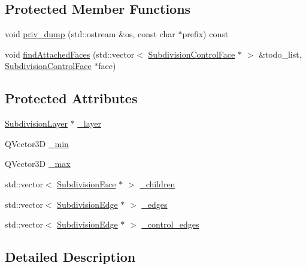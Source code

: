 \subsection*{Protected Member Functions}
\begin{DoxyCompactItemize}
\item 
void \hyperlink{classShipCAD_1_1SubdivisionControlFace_a224ce57a8d9d631eef63cccd8e0113f9}{priv\-\_\-dump} (std\-::ostream \&os, const char $\ast$prefix) const 
\item 
void \hyperlink{classShipCAD_1_1SubdivisionControlFace_aa6035e53cd1e32a9bd9e9f9800c9f7d4}{find\-Attached\-Faces} (std\-::vector$<$ \hyperlink{classShipCAD_1_1SubdivisionControlFace}{Subdivision\-Control\-Face} $\ast$ $>$ \&todo\-\_\-list, \hyperlink{classShipCAD_1_1SubdivisionControlFace}{Subdivision\-Control\-Face} $\ast$face)
\end{DoxyCompactItemize}
\subsection*{Protected Attributes}
\begin{DoxyCompactItemize}
\item 
\hyperlink{classShipCAD_1_1SubdivisionLayer}{Subdivision\-Layer} $\ast$ \hyperlink{classShipCAD_1_1SubdivisionControlFace_aee1990d4db7127ba59117a65c1a6ce7e}{\-\_\-layer}
\item 
Q\-Vector3\-D \hyperlink{classShipCAD_1_1SubdivisionControlFace_aac4f577da0f5203059901c5e09814e1d}{\-\_\-min}
\item 
Q\-Vector3\-D \hyperlink{classShipCAD_1_1SubdivisionControlFace_a22411574593283209772872bc740535b}{\-\_\-max}
\item 
std\-::vector$<$ \hyperlink{classShipCAD_1_1SubdivisionFace}{Subdivision\-Face} $\ast$ $>$ \hyperlink{classShipCAD_1_1SubdivisionControlFace_a116749a1de58ad46f68ad7e92031e673}{\-\_\-children}
\item 
std\-::vector$<$ \hyperlink{classShipCAD_1_1SubdivisionEdge}{Subdivision\-Edge} $\ast$ $>$ \hyperlink{classShipCAD_1_1SubdivisionControlFace_a390f626d9999ab3ce48878b223ea1693}{\-\_\-edges}
\item 
std\-::vector$<$ \hyperlink{classShipCAD_1_1SubdivisionEdge}{Subdivision\-Edge} $\ast$ $>$ \hyperlink{classShipCAD_1_1SubdivisionControlFace_a33d7e2ecd5f42edf5492efb83df3856b}{\-\_\-control\-\_\-edges}
\end{DoxyCompactItemize}


\subsection{Detailed Description}


